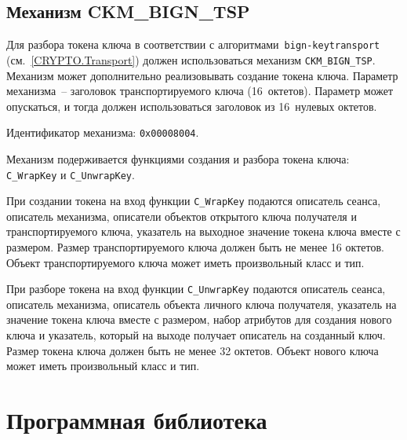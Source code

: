 \subsection{Механизм CKM\_BIGN\_TSP}\label{CRYPTOKI.Transport}


Для разбора токена ключа в соответствии с алгоритмами~\texttt{bign-keytransport}
(см.~\ref{CRYPTO.Transport}) должен использоваться механизм \verb|CKM_BIGN_TSP|. 
Механизм может дополнительно реализовывать создание токена ключа.
%
Параметр механизма~-- заголовок транспортируемого ключа (16~октетов). 
Параметр может опускаться, и тогда должен использоваться
заголовок из 16~нулевых октетов.

Идентификатор механизма: \texttt{0x00008004}.

Механизм подерживается функциями создания и разбора токена ключа:
\verb|C_WrapKey| и \verb|C_UnwrapKey|.

При создании токена на вход функции \verb|C_WrapKey| подаются
описатель сеанса, описатель механизма, описатели объектов открытого ключа
получателя и транспортируемого ключа, указатель на
выходное значение токена ключа вместе с размером.
Размер транспортируемого ключа должен быть не менее 16 октетов.
Объект транспортируемого ключа может иметь произвольный класс и тип.

При разборе токена на вход функции \verb|C_UnwrapKey| подаются
описатель сеанса, описатель механизма, описатель объекта личного ключа
получателя, указатель на значение токена ключа вместе с размером,
набор атрибутов для создания нового ключа и указатель,
который на выходе получает описатель на созданный ключ.
Размер токена ключа должен быть не менее 32 октетов.
Объект нового ключа может иметь произвольный класс и тип.

\section{Программная библиотека}\label{CRYPTOKI.Lib}

